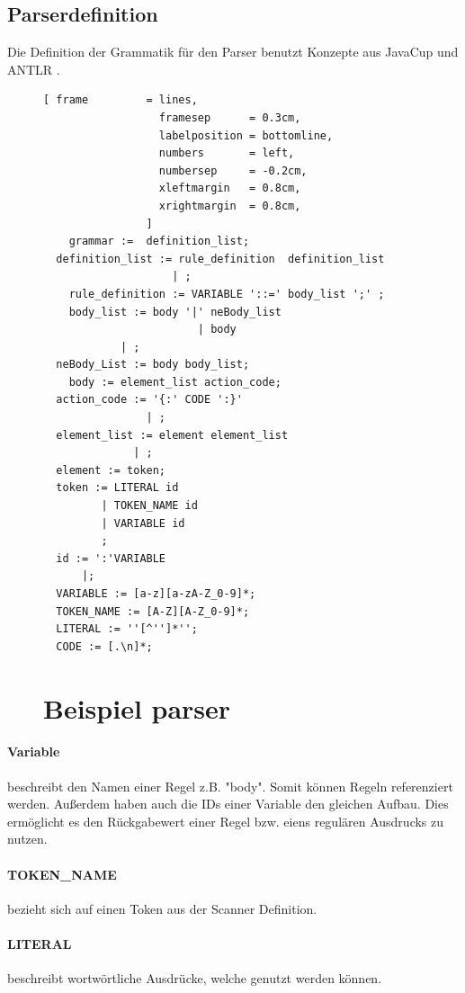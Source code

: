 \subsection{Parserdefinition}
Die Definition der Grammatik für den Parser benutzt Konzepte aus JavaCup und ANTLR .
\begin{figure}[!ht]
\begin{Verbatim}[ frame         = lines, 
                  framesep      = 0.3cm, 
                  labelposition = bottomline,
                  numbers       = left,
                  numbersep     = -0.2cm,
                  xleftmargin   = 0.8cm,
                  xrightmargin  = 0.8cm,
                ]
	grammar :=  definition_list;
  definition_list := rule_definition  definition_list
                    | ;
	rule_definition := VARIABLE '::=' body_list ';' ;
	body_list := body '|' neBody_list
						| body
            | ;
  neBody_List := body body_list;
	body := element_list action_code;
  action_code := '{:' CODE ':}'
                | ;
  element_list := element element_list
              | ;
  element := token;
  token := LITERAL id
         | TOKEN_NAME id
         | VARIABLE id
         ;
  id := ':'VARIABLE
      |;
  VARIABLE := [a-z][a-zA-Z_0-9]*;
  TOKEN_NAME := [A-Z][A-Z_0-9]*;
  LITERAL := ''[^'']*'';
  CODE := [.\n]*;
\end{Verbatim}
\section{Beispiel parser}
\label{fig:example_grammer}
\end{figure}
\paragraph{Variable} beschreibt den Namen einer Regel z.B. "body". Somit können Regeln referenziert werden.  Außerdem haben auch die IDs einer Variable den gleichen Aufbau. Dies ermöglicht es den Rückgabewert einer Regel bzw. eiens regulären Ausdrucks zu nutzen.
\paragraph{TOKEN\_NAME} bezieht sich auf einen Token aus der Scanner Definition.
\paragraph{LITERAL}  beschreibt wortwörtliche Ausdrücke, welche genutzt werden können. 
